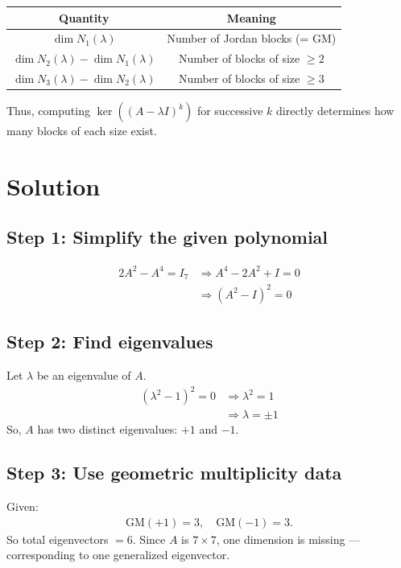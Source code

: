 \documentclass[12pt]{article}
\begin{document}
\begin{table}[H]
\centering
\renewcommand{\arraystretch}{1.3}
\begin{tabular}{|c|c|}
\hline
\textbf{Quantity} & \textbf{Meaning} \\
\hline
$\dim N_1(\lambda)$ & Number of Jordan blocks (= GM) \\
\hline
$\dim N_2(\lambda) - \dim N_1(\lambda)$ & Number of blocks of size $\ge 2$ \\
\hline
$\dim N_3(\lambda) - \dim N_2(\lambda)$ & Number of blocks of size $\ge 3$ \\
\hline
\end{tabular}
\end{table}

Thus, computing $\ker((A-\lambda I)^k)$ for successive $k$ directly determines how many blocks of each size exist.

\section*{Solution}

\subsection*{Step 1: Simplify the given polynomial}
\begin{align}
2A^2 - A^4 = I_7
&\Rightarrow A^4 - 2A^2 + I = 0\\
&\Rightarrow (A^2 - I)^2 = 0
\end{align}

\subsection*{Step 2: Find eigenvalues}
Let $\lambda$ be an eigenvalue of $A$.
\begin{align}
(\lambda^2 - 1)^2 = 0 
&\Rightarrow \lambda^2 = 1\\
&\Rightarrow \lambda = \pm 1
\end{align}
So, $A$ has two distinct eigenvalues: $+1$ and $-1$.

\subsection*{Step 3: Use geometric multiplicity data}

Given:
\begin{align}
\text{GM}(+1) = 3,\quad \text{GM}(-1) = 3.
\end{align}
So total eigenvectors $=6$.  
Since $A$ is $7\times7$, one dimension is missing — corresponding to one generalized eigenvector.
\end{document}
